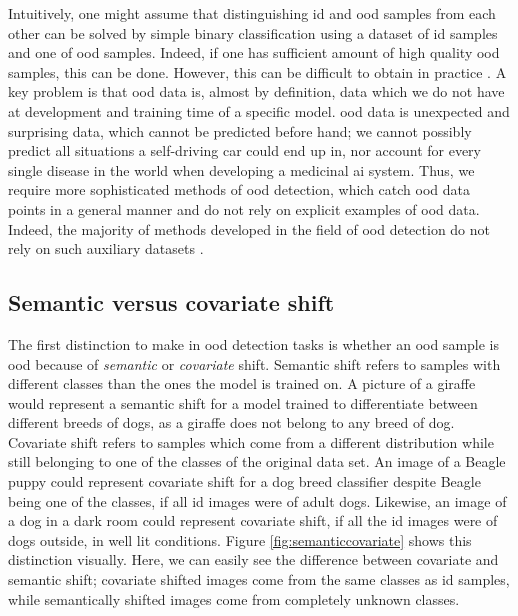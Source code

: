 \documentclass[UKenglish]{uiomasterthesis} %
\theoremstyle{definition}
\begin{document}
Intuitively, one might assume that distinguishing \ac{id} and \ac{ood} samples from each other can be solved by simple binary classification using a dataset of \ac{id} samples and one of \ac{ood} samples. Indeed, if one has sufficient amount of high quality \ac{ood} samples, this can be done. However, this can be difficult to obtain in practice \cite[15]{oodoverview}. A key problem is that \ac{ood} data is, almost by definition, data which we do not have at development and training time of a specific model. \ac{ood} data is unexpected and surprising data, which cannot be predicted before hand; we cannot possibly predict all situations a self-driving car could end up in, nor account for every single disease in the world when developing a medicinal \ac{ai} system. Thus, we require more sophisticated methods of \ac{ood} detection, which catch \ac{ood} data points in a general manner and do not rely on explicit examples of \ac{ood} data. Indeed, the majority of methods developed in the field of \ac{ood} detection do not rely on such auxiliary datasets \cite{openood}. %

\subsection{Semantic versus covariate shift}

The first distinction to make in \ac{ood} detection tasks is whether an \ac{ood} sample is \ac{ood} because of {\it semantic} or {\it covariate} shift. Semantic shift refers to samples with different classes than the ones the model is trained on. A picture of a giraffe would represent a semantic shift for a model trained to differentiate between different breeds of dogs, as a giraffe does not belong to any breed of dog. Covariate shift refers to samples which come from a different distribution while still belonging to one of the classes of the original data set. An image of a Beagle puppy could represent covariate shift for a dog breed classifier despite Beagle being one of the classes, if all \ac{id} images were of adult dogs. Likewise, an image of a dog in a dark room could represent covariate shift, if all the \ac{id} images were of dogs outside, in well lit conditions. Figure \ref{fig:semanticcovariate} shows this distinction visually. Here, we can easily see the difference between covariate and semantic shift; covariate shifted images come from the same classes as \ac{id} samples, while semantically shifted images come from completely unknown classes.
\end{document}
